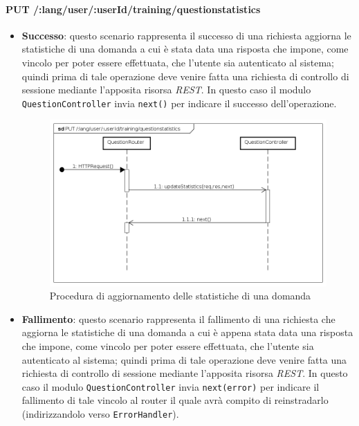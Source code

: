 \paragraph{PUT /:lang/user/:userId/training/questionstatistics} %
\begin{itemize}
\item \textbf{Successo}: questo scenario rappresenta il successo di una richiesta aggiorna le statistiche di una domanda a cui è stata data una risposta che impone, come vincolo per poter essere effettuata, che l'utente sia autenticato al sistema; quindi prima di tale operazione deve venire fatta una richiesta di controllo di sessione mediante l'apposita risorsa \textit{REST}. In questo caso il modulo \texttt{QuestionController} invia \texttt{next()} per indicare il successo dell'operazione.

\begin{figure}[ht]
	\centering
	\includegraphics[scale=0.45]{UML/DiagrammiDiSequenza/Back-end/PUT__lang_user__userId_training_questionstatistics_success.png}
	\caption{Procedura di aggiornamento delle statistiche di una domanda}
\end{figure}
\FloatBarrier

\item \textbf{Fallimento}: questo scenario rappresenta il fallimento di una richiesta che aggiorna le statistiche di una domanda a cui è appena stata data una risposta che impone, come vincolo per poter essere effettuata, che l'utente sia autenticato al sistema; quindi prima di tale operazione deve venire fatta una richiesta di controllo di sessione mediante l'apposita risorsa \textit{REST}. In questo caso il modulo \texttt{QuestionController} invia \texttt{next(error)} per indicare il fallimento di tale vincolo al router il quale avrà compito di reinstradarlo (indirizzandolo verso \texttt{ErrorHandler}).


\end{itemize}
